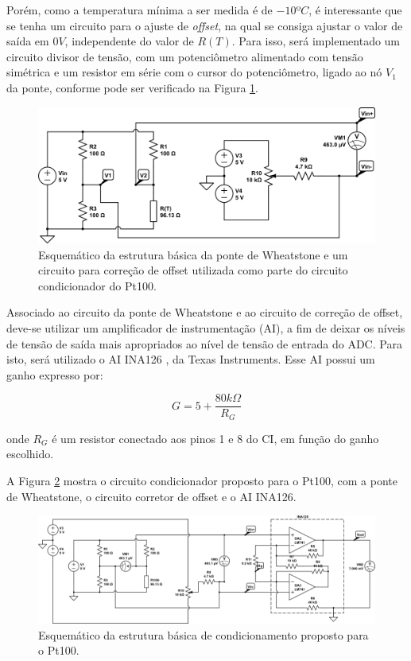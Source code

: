 \documentclass[a4paper]{instrumentacao}
\begin{document}
Porém, como a temperatura mínima a ser medida é de $-10ºC$, é interessante que se tenha um circuito para o ajuste de \textit{offset}, na qual se consiga ajustar o valor de   saída em $0V$, independente do valor de $R(T)$. Para isso, será implementado um circuito divisor de tensão, com um potenciômetro alimentado com tensão simétrica e um resistor em série com o cursor do potenciômetro, ligado ao nó $V_1$ da ponte, conforme pode ser verificado na Figura \ref{fig:termometro-ponte-offset}.

\begin{figure}[H]
	\centering \includegraphics[width=\textwidth]{pt100-ponte-offset.png}
	\caption{Esquemático da estrutura básica da ponte de Wheatstone e um circuito para correção de offset utilizada como parte do circuito condicionador do Pt100.}
	\label{fig:termometro-ponte-offset}
\end{figure}

Associado ao circuito da ponte de Wheatstone e ao circuito de correção de offset, deve-se utilizar um amplificador de instrumentação (AI), a fim de deixar os níveis de tensão de saída mais apropriados ao nível de tensão de entrada do ADC. Para isto, será utilizado o AI INA126 \cite{datasheet-INA126}, da Texas Instruments. Esse AI possui um ganho expresso por:

 \begin{equation}
	G=5+\frac{80k\Omega}{R_G}
	\label{eq:ganho-INA126}
\end{equation}

\noindent onde $R_G$ é um resistor conectado aos pinos 1 e 8 do CI, em função do ganho escolhido.

A Figura \ref{fig:termometro-ckt-condicionador-completo} mostra o circuito condicionador proposto para o Pt100, com a ponte de Wheatstone, o circuito corretor de offset e o AI INA126.

\begin{figure}[H]
	\centering \includegraphics[width=\textwidth]{pt100-ponte-com-ina-min.png}
	\caption{Esquemático da estrutura básica de condicionamento proposto para o Pt100.}
	\label{fig:termometro-ckt-condicionador-completo}
\end{figure}
\end{document}
